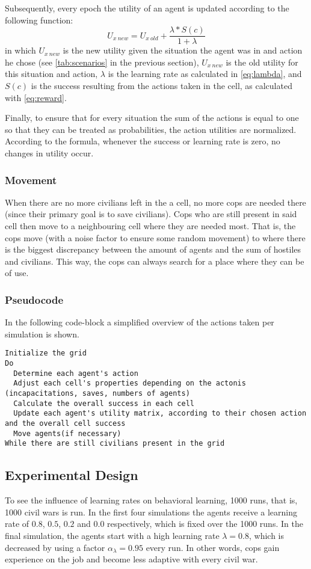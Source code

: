 Subsequently, every epoch the utility of an agent is updated according to the following function:
\begin{equation} \label{eq:utility}
U_{x~new} = U_{x~old} + \frac{\lambda * S(c)}{1+\lambda}
\end{equation}
in which $U_{x~new}$ is the new utility given the situation the agent was in and action he chose (see \autoref{tab:scenarios} in the previous section), $U_{x~new}$ is the old utility for this situation and action,
$\lambda$ is the learning rate as calculated in \autoref{eq:lambda}, and $S(c)$ is the success resulting from the actions taken in the cell, as calculated with \autoref{eq:reward}.

Finally, to ensure that for every situation the sum of the actions is equal to one so that they can be treated as probabilities, 
the action utilities are normalized.
According to the formula, whenever the success or learning rate is zero, no changes in utility occur.

\subsubsection{Movement}
When there are no more civilians left in the a cell, no more cops are needed there (since their primary goal is to save civilians).
Cops who are still present in said cell then move to a neighbouring cell where they are needed most.
That is, the cops move (with a noise factor to ensure some random movement) to where there is the biggest discrepancy between the amount of agents and the sum of hostiles and civilians.
This way, the cops can always search for a place where they can be of use.

\subsubsection{Pseudocode}
In the following code-block a simplified overview of the actions taken per simulation is shown.
\begin{lstlisting}
Initialize the grid
Do
  Determine each agent's action 
  Adjust each cell's properties depending on the actonis (incapacitations, saves, numbers of agents)  
  Calculate the overall success in each cell
  Update each agent's utility matrix, according to their chosen action and the overall cell success
  Move agents(if necessary)
While there are still civilians present in the grid
\end{lstlisting}

\subsection{Experimental Design}
To see the influence of learning rates on behavioral learning, 1000 runs, that is, 1000 civil wars is run.
In the first four simulations the agents receive a learning rate of $0.8$, $0.5$, $0.2$ and $0.0$ respectively, which is fixed over the 1000 runs.
In the final simulation, the agents start with a high learning rate $\lambda = 0.8$, 
which is decreased by using a factor  $\alpha_\lambda = 0.95$ every run.
In other words, cops gain experience on the job and become less adaptive with every civil war.

